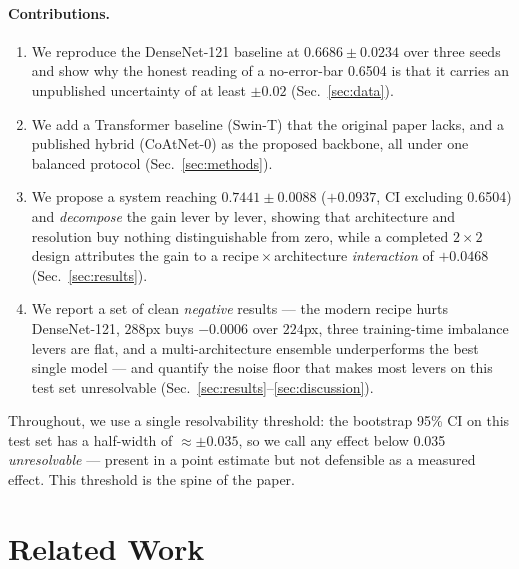 \documentclass[11pt,a4paper]{article}
\begin{document}
\paragraph{Contributions.}
\begin{enumerate}\itemsep2pt
\item We reproduce the DenseNet-121 baseline at $0.6686\pm0.0234$ over three
seeds and show why the honest reading of a no-error-bar 0.6504 is that it
carries an unpublished uncertainty of at least $\pm0.02$ (Sec.~\ref{sec:data}).
\item We add a Transformer baseline (Swin-T) that the original paper lacks, and
a published hybrid (CoAtNet-0) as the proposed backbone, all under one balanced
protocol (Sec.~\ref{sec:methods}).
\item We propose a system reaching $0.7441\pm0.0088$ ($+0.0937$, CI excluding
0.6504) and \emph{decompose} the gain lever by lever, showing that architecture
and resolution buy nothing distinguishable from zero, while a completed
$2{\times}2$ design attributes the gain to a recipe\,$\times$\,architecture
\emph{interaction} of $+0.0468$ (Sec.~\ref{sec:results}).
\item We report a set of clean \emph{negative} results --- the modern recipe
hurts DenseNet-121, $288$px buys $-0.0006$ over $224$px, three training-time
imbalance levers are flat, and a multi-architecture ensemble underperforms the
best single model --- and quantify the noise floor that makes most levers on
this test set unresolvable (Sec.~\ref{sec:results}--\ref{sec:discussion}).
\end{enumerate}

Throughout, we use a single resolvability threshold: the bootstrap 95\% CI on this
test set has a half-width of $\approx\pm0.035$, so we call any effect below
0.035 \emph{unresolvable} --- present in a point estimate but not defensible as
a measured effect. This threshold is the spine of the paper.

\section{Related Work}
\label{sec:related}
\end{document}
